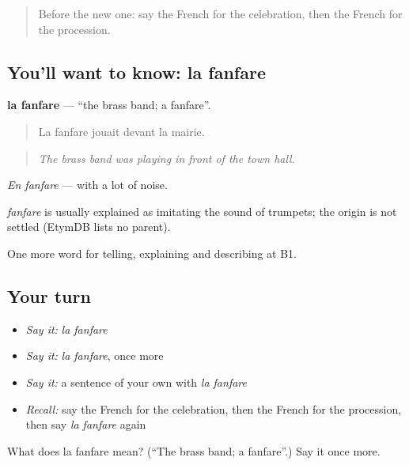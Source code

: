 \begin{quote}
Before the new one: say the French for the celebration, then the French for the procession.
\end{quote}

\subsection*{You'll want to know: la fanfare}
\textbf{la fanfare} — \textquotedblleft{}the brass band; a fanfare\textquotedblright{}.

\begin{quote}
La fanfare jouait devant la mairie.
\end{quote}

\begin{quote}
\emph{The brass band was playing in front of the town hall.}
\end{quote}

\emph{En fanfare} — with a lot of noise.

\begin{cousinweb}
\emph{fanfare} is usually explained as imitating the sound of trumpets; the origin is not settled (EtymDB lists no parent).
\end{cousinweb}

\begin{grammarlens}[title={What you've built}]
One more word for telling, explaining and describing at B1.
\end{grammarlens}

\subsection*{Your turn}
\begin{itemize}
\raggedright
  \item \emph{Say it:} \emph{la fanfare}
  \item \emph{Say it:} \emph{la fanfare}, once more
  \item \emph{Say it:} a sentence of your own with \emph{la fanfare}
  \item \emph{Recall:} say the French for the celebration, then the French for the procession, then say \emph{la fanfare} again
\end{itemize}

\begin{tcolorbox}[breakable,colback=teal!4,colframe=teal!35!black,title={Before you move on}]
What does la fanfare mean? (\textquotedblleft{}The brass band; a fanfare\textquotedblright{}.) Say it once more.
\end{tcolorbox}
